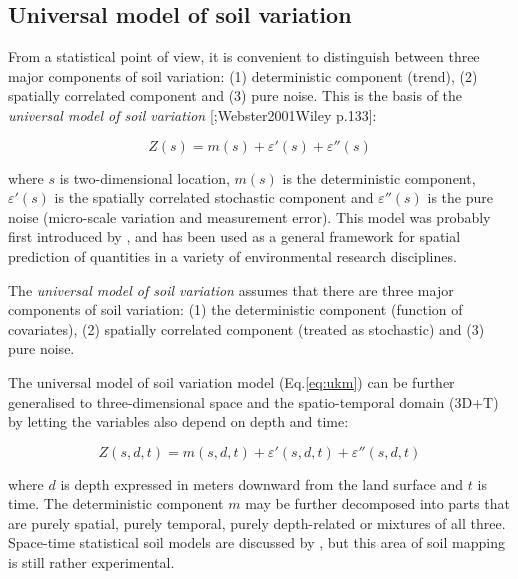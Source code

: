 \documentclass[graybox,natbib,nospthms,UStrade]{svmono}
\let\BeginKnitrBlock\begin \let\EndKnitrBlock\end
\let\BeginKnitrBlock\begin \let\EndKnitrBlock\end
\begin{document}
\hypertarget{umsv}{%
\subsection{Universal model of soil variation}\label{umsv}}

From a statistical point of view, it is convenient to distinguish
between three major components of soil variation: (1) deterministic
component (trend), (2) spatially correlated component and (3) pure
noise. This is the basis of the \emph{universal model of soil variation}
{[}\citet{Burrough1998OUP};Webster2001Wiley p.133{]}:

\begin{equation}
Z({s}) = m({s}) + \varepsilon '({s}) + \varepsilon ''({s})
\label{eq:ukm}
\end{equation}

where \(s\) is two-dimensional location, \(m({s})\) is the
deterministic component, \(\varepsilon '({s})\) is the spatially
correlated stochastic component and \(\varepsilon ''({s})\) is the
pure noise (micro-scale variation and measurement error). This model was
probably first introduced by \citet{Matheron1969PhD}, and has been used as a
general framework for spatial prediction of quantities in a variety of
environmental research disciplines.

\BeginKnitrBlock{rmdnote}
The \emph{universal model of soil variation} assumes that there are three
major components of soil variation: (1) the deterministic component
(function of covariates), (2) spatially correlated component (treated as
stochastic) and (3) pure noise.
\EndKnitrBlock{rmdnote}

The universal model of soil variation model (Eq.\eqref{eq:ukm}) can be
further generalised to three-dimensional space and the spatio-temporal
domain (3D+T) by letting the variables also depend on depth and time:

\begin{equation}
Z({s}, d, t) = m({s}, d, t) + \varepsilon '({s}, d, t) + \varepsilon ''({s}, d, t)
\label{eq:ukm3DT}
\end{equation}

where \(d\) is depth expressed in meters downward from the land surface
and \(t\) is time. The deterministic component \(m\) may be further
decomposed into parts that are purely spatial, purely temporal, purely
depth-related or mixtures of all three. Space-time statistical soil
models are discussed by \citet{Grunwald2005CRCPress}, but this area of soil
mapping is still rather experimental.
\end{document}
